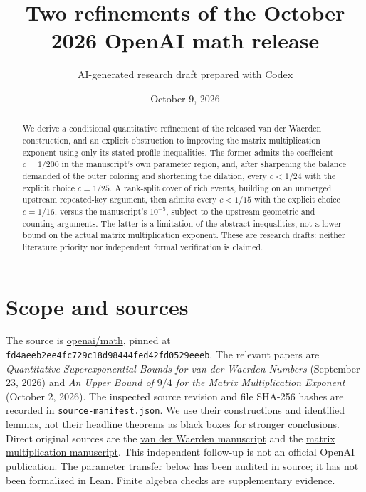 \documentclass[11pt]{article}
\title{Two refinements of the October 2026 OpenAI math release}
\author{AI-generated research draft prepared with Codex}
\date{October 9, 2026}
\begin{document}
\maketitle
\begin{abstract}
We derive a conditional quantitative refinement of the released van der
Waerden construction, and an explicit obstruction to improving the matrix
multiplication exponent using only its stated profile inequalities.
The former admits the coefficient $c=1/200$ in the manuscript's own
parameter region, and, after sharpening the balance demanded of the
outer coloring and shortening the dilation, every $c<1/24$ with the
explicit choice $c=1/25$. A rank-split cover of rich events, building on
an unmerged upstream repeated-key argument, then admits every $c<1/15$
with the explicit choice $c=1/16$, versus the manuscript's $10^{-5}$, subject
to the upstream geometric and counting arguments.
The latter is a limitation of the abstract inequalities, not a lower bound
on the actual matrix multiplication exponent. These are research drafts:
neither literature priority nor independent formal verification is claimed.
\end{abstract}

\section{Scope and sources}
The source is \href{https://github.com/openai/math}{openai/math}, pinned at
\texttt{fd4aeeb2ee4fc729c18d98444fed42fd0529eeeb}.
The relevant papers are \emph{Quantitative Superexponential Bounds for van
der Waerden Numbers} (September 23, 2026) and \emph{An Upper Bound of
$9/4$ for the Matrix Multiplication Exponent} (October 2, 2026).
The inspected source revision and file SHA-256 hashes are recorded in
\texttt{source-manifest.json}. We use their constructions and identified
lemmas, not their headline theorems as black boxes for stronger conclusions.
Direct original sources are the
\href{https://github.com/openai/math/tree/fd4aeeb2ee4fc729c18d98444fed42fd0529eeeb/preprints/Quantitative-Superexponential-Bounds-for-van-der-Waerden-Numbers-September-23-2026}{van der Waerden manuscript}
and the
\href{https://github.com/openai/math/tree/fd4aeeb2ee4fc729c18d98444fed42fd0529eeeb/preprints/Matrix-Multiplication-Nine-Fourths-October-2-2026}{matrix multiplication manuscript}.
This independent follow-up is not an official OpenAI publication.
The parameter transfer below has been audited in source; it has not been
formalized in Lean. Finite algebra checks are supplementary evidence.
\end{document}

